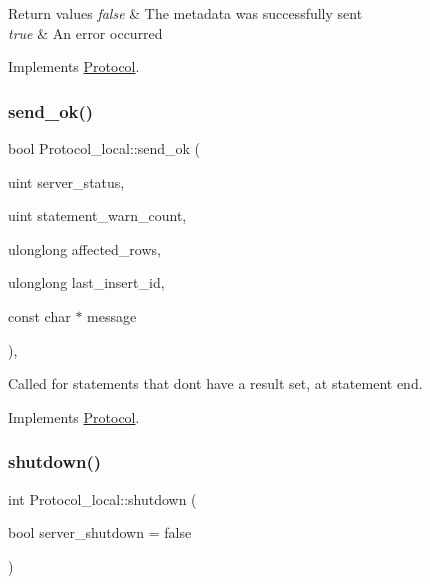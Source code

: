 \begin{DoxyRetVals}{Return values}
{\em false} & The metadata was successfully sent \\
\hline
{\em true} & An error occurred \\
\hline
\end{DoxyRetVals}


Implements \mbox{\hyperlink{classProtocol_ab1c4f70c198fa10fbf4aed0dfc2c4847}{Protocol}}.

\mbox{\label{classProtocol__local_ace027ac8707dd2e774e1955319ffe615}} 
\subsubsection{\texorpdfstring{send\+\_\+ok()}{send\_ok()}}
{\footnotesize\ttfamily bool Protocol\+\_\+local\+::send\+\_\+ok (\begin{DoxyParamCaption}\item[{uint}]{server\+\_\+status,  }\item[{uint}]{statement\+\_\+warn\+\_\+count,  }\item[{ulonglong}]{affected\+\_\+rows,  }\item[{ulonglong}]{last\+\_\+insert\+\_\+id,  }\item[{const char $\ast$}]{message }\end{DoxyParamCaption})\hspace{0.3cm}{\ttfamily [protected]}, {\ttfamily [virtual]}}

Called for statements that don\textquotesingle{}t have a result set, at statement end. 

Implements \mbox{\hyperlink{classProtocol_a5af2742550f44725128e121eb647eb34}{Protocol}}.

\mbox{\label{classProtocol__local_a7f88c42439a65e26a2651d3ec4c64e0c}} 
\subsubsection{\texorpdfstring{shutdown()}{shutdown()}}
{\footnotesize\ttfamily int Protocol\+\_\+local\+::shutdown (\begin{DoxyParamCaption}\item[{bool}]{server\+\_\+shutdown = {\ttfamily false} }\end{DoxyParamCaption})\hspace{0.3cm}{\ttfamily [virtual]}}

